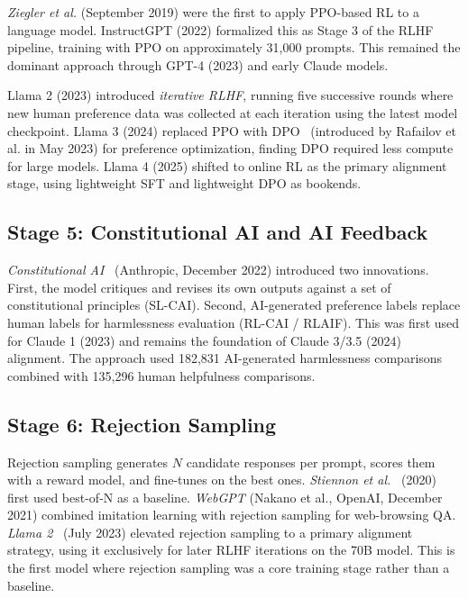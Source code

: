 \documentclass[12pt]{article}
\begin{document}
\textit{Ziegler et al.} (September 2019) were the first to apply PPO-based RL to a language model. InstructGPT (2022) formalized this as Stage 3 of the RLHF pipeline, training with PPO on approximately 31,000 prompts. This remained the dominant approach through GPT-4 (2023) and early Claude models.

Llama 2 (2023) introduced \textit{iterative RLHF}, running five successive rounds where new human preference data was collected at each iteration using the latest model checkpoint. Llama 3 (2024) replaced PPO with DPO~\cite{Rafailov2023DPO} (introduced by Rafailov et al. in May 2023) for preference optimization, finding DPO required less compute for large models. Llama 4 (2025) shifted to online RL as the primary alignment stage, using lightweight SFT and lightweight DPO as bookends.

\subsection{Stage 5: Constitutional AI and AI Feedback}

\textit{Constitutional AI}~\cite{Bai2022Constitutional} (Anthropic, December 2022) introduced two innovations. First, the model critiques and revises its own outputs against a set of constitutional principles (SL-CAI). Second, AI-generated preference labels replace human labels for harmlessness evaluation (RL-CAI / RLAIF). This was first used for Claude 1 (2023) and remains the foundation of Claude 3/3.5 (2024) alignment. The approach used 182,831 AI-generated harmlessness comparisons combined with 135,296 human helpfulness comparisons.

\subsection{Stage 6: Rejection Sampling}

Rejection sampling generates $N$ candidate responses per prompt, scores them with a reward model, and fine-tunes on the best ones. \textit{Stiennon et al.}~\cite{Stiennon2020Summarize} (2020) first used best-of-N as a baseline. \textit{WebGPT} (Nakano et al., OpenAI, December 2021) combined imitation learning with rejection sampling for web-browsing QA. \textit{Llama 2}~\cite{Touvron2023Llama2} (July 2023) elevated rejection sampling to a primary alignment strategy, using it exclusively for later RLHF iterations on the 70B model. This is the first model where rejection sampling was a core training stage rather than a baseline.
\end{document}
